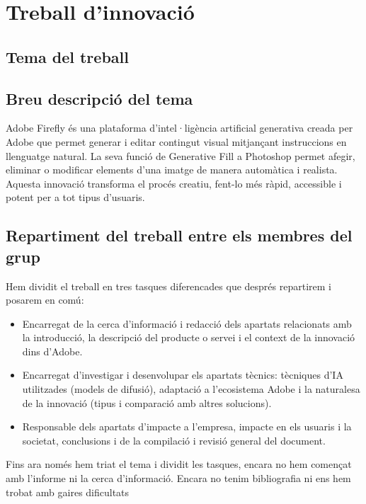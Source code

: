 \clearpage
\section{Treball d'innovació}

\vspace{0.5cm}


\subsection{Tema del treball}

\vspace{0.5cm}


\subsection{Breu descripció del tema}
Adobe Firefly és una plataforma d’intel·ligència artificial generativa creada per Adobe que permet generar i editar contingut visual mitjançant instruccions en llenguatge natural. La seva funció de Generative Fill a Photoshop permet afegir, eliminar o modificar elements d’una imatge de manera automàtica i realista. Aquesta innovació transforma el procés creatiu, fent-lo més ràpid, accessible i potent per a tot tipus d’usuaris.

\vspace{0.5cm}


\subsection{Repartiment del treball entre els membres del grup}

Hem dividit el treball en tres tasques diferencades que després repartirem i posarem en comú:

\begin{itemize}
    \item Encarregat de la cerca d’informació i redacció dels apartats relacionats amb la introducció, la descripció del producte o servei i el context de la innovació dins d’Adobe.
    \item Encarregat d'investigar i desenvolupar els apartats tècnics: tècniques d’IA utilitzades (models de difusió), adaptació a l’ecosistema Adobe i la naturalesa de la innovació (tipus i comparació amb altres solucions).
    \item Responsable dels apartats d’impacte a l’empresa, impacte en els usuaris i la societat, conclusions i de la compilació i revisió general del document.
    
\end{itemize}

Fins ara només hem triat el tema i dividit les tasques, encara no hem començat amb l'informe ni la cerca d'informació. Encara no tenim bibliografia ni ens hem trobat amb gaires dificultats

